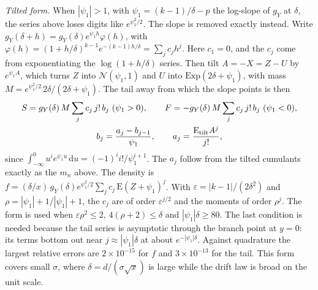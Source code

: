 \documentclass[12pt]{article}
\newcommand{\dd}{\,\mathrm{d}}
\newcommand{\Normal}{\mathcal{N}}
\begin{document}
\emph{Tilted form.} When $|\psi_1|>1$, with $\psi_1=(k-1)/\delta-p$ the log-slope of $g_Y$ at $\delta$, the series above loses digits like $e^{\psi_1^2/2}$. The slope is removed exactly instead. Write $g_Y(\delta+h)=g_Y(\delta)e^{\psi_1h}\varphi(h)$, with $\varphi(h)=(1+h/\delta)^{k-1}e^{-(k-1)h/\delta}=\sum_jc_jh^j$. Here $c_1=0$, and the $c_j$ come from exponentiating the $\log(1+h/\delta)$ series. Then tilt $A=-X=Z-U$ by $e^{\psi_1A}$, which turns $Z$ into $\Normal(\psi_1,1)$ and $U$ into $\mathrm{Exp}(2\delta+\psi_1)$, with mass $M=e^{\psi_1^2/2}\,2\delta/(2\delta+\psi_1)$. The tail away from which the slope points is then
\begin{gather*}
  S=g_Y(\delta)\,M\sum_jc_j\,j!\,b_j\ (\psi_1>0),\qquad
  F=-g_Y(\delta)\,M\sum_jc_j\,j!\,b_j\ (\psi_1<0),\\
  b_j=\frac{a_j-b_{j-1}}{\psi_1},\qquad a_j=\frac{\mathrm E_{\rm tilt}A^j}{j!},
\end{gather*}
since $\int_{-\infty}^0u^ie^{\psi_1u}\dd u=(-1)^ii!/\psi_1^{i+1}$. The $a_j$ follow from the tilted cumulants exactly as the $m_n$ above. The density is $f=(\delta/x)\,g_Y(\delta)e^{\psi_1^2/2}\sum_jc_j\,\mathrm E(Z+\psi_1)^j$. With $\varepsilon=|k-1|/(2\delta^2)$ and $\rho=|\psi_1|+1/|\psi_1|+1$, the $c_j$ are of order $\varepsilon^{j/2}$ and the moments of order $\rho^j$. The form is used when $\varepsilon\rho^2\le2$, $4(\rho+2)\le\delta$ and $|\psi_1|\delta\ge80$. The last condition is needed because the tail series is asymptotic through the branch point at $y=0$: its terms bottom out near $j\approx|\psi_1|\delta$ at about $e^{-|\psi_1|\delta}$. Against quadrature the largest relative errors are $2\times10^{-15}$ for $f$ and $3\times10^{-13}$ for the tail. This form covers small $\sigma$, where $\delta=d/(\sigma\sqrt x)$ is large while the drift law is broad on the unit scale.
\end{document}
